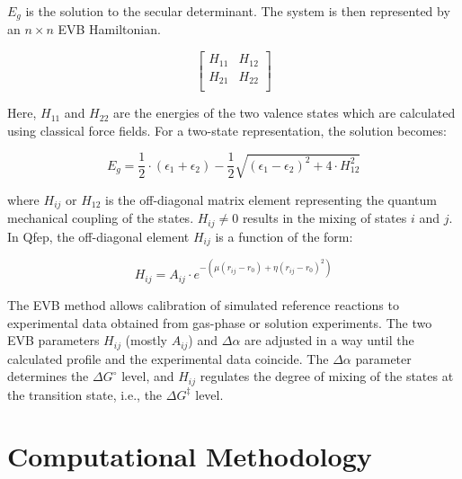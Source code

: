 \documentclass{article}
\begin{document}
\(E_g\) is the solution to the secular determinant. The system is then represented by an \(n \times n\) EVB Hamiltonian.

\[ 
  \left[\begin{array}{cc}
    H_{11} & H_{12} \\
    H_{21} & H_{22} \\
  \end{array}\right]
\]

Here, \(H_{11}\) and \(H_{22}\) are the energies of the two valence states which are calculated using classical force fields. 
For a two-state representation, the solution becomes:

\begin{equation}
    E_g = \frac{1}{2} \cdot \left( \epsilon_1 + \epsilon_2 \right) - \frac{1}{2} \sqrt{ \left( \epsilon_1 - \epsilon_2 \right)^2 + 4 \cdot H_{12}^2 }
\end{equation}

where \(H_{ij}\) or \(H_{12}\) is the off-diagonal matrix element representing the quantum mechanical coupling of the states. \(H_{ij} \neq 0\) results in the mixing of states \(i\) and \(j\). In Qfep, the off-diagonal element \(H_{ij}\) is a function of the form:

\begin{equation}
    H_{ij} = A_{ij} \cdot e^{-(\mu (r_{ij} - r_0) + \eta (r_{ij} - r_0)^2)}
\end{equation}

The EVB method allows calibration of simulated reference reactions to experimental data obtained from gas-phase or solution experiments. The two EVB parameters \(H_{ij}\) (mostly \(A_{ij}\)) and \(\Delta \alpha\) are adjusted in a way until the calculated profile and the experimental data coincide. The \(\Delta \alpha\) parameter determines the \(\Delta G^\circ\) level, and \(H_{ij}\) regulates the degree of mixing of the states at the transition state, i.e., the \(\Delta G^\ddagger\) level.


\section{Computational Methodology}
\end{document}
